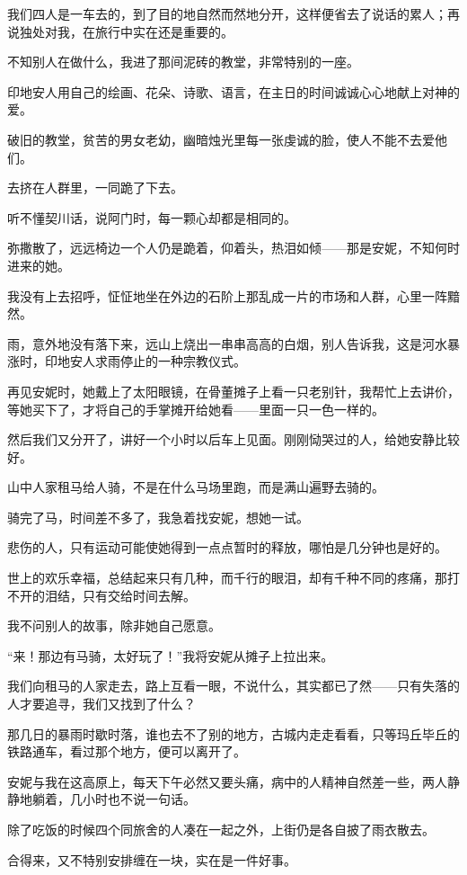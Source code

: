 \par 我们四人是一车去的，到了目的地自然而然地分开，这样便省去了说话的累人；再说独处对我，在旅行中实在还是重要的。
\par 不知别人在做什么，我进了那间泥砖的教堂，非常特别的一座。
\par 印地安人用自己的绘画、花朵、诗歌、语言，在主日的时间诚诚心心地献上对神的爱。
\par 破旧的教堂，贫苦的男女老幼，幽暗烛光里每一张虔诚的脸，使人不能不去爱他们。
\par 去挤在人群里，一同跪了下去。
\par 听不懂契川话，说阿门时，每一颗心却都是相同的。
\par 弥撒散了，远远椅边一个人仍是跪着，仰着头，热泪如倾——那是安妮，不知何时进来的她。
\par 我没有上去招呼，怔怔地坐在外边的石阶上那乱成一片的市场和人群，心里一阵黯然。
\par 雨，意外地没有落下来，远山上烧出一串串高高的白烟，别人告诉我，这是河水暴涨时，印地安人求雨停止的一种宗教仪式。
\par 再见安妮时，她戴上了太阳眼镜，在骨董摊子上看一只老别针，我帮忙上去讲价，等她买下了，才将自己的手掌摊开给她看——里面一只一色一样的。
\par 然后我们又分开了，讲好一个小时以后车上见面。刚刚恸哭过的人，给她安静比较好。
\par 山中人家租马给人骑，不是在什么马场里跑，而是满山遍野去骑的。
\par 骑完了马，时间差不多了，我急着找安妮，想她一试。
\par 悲伤的人，只有运动可能使她得到一点点暂时的释放，哪怕是几分钟也是好的。
\par 世上的欢乐幸福，总结起来只有几种，而千行的眼泪，却有千种不同的疼痛，那打不开的泪结，只有交给时间去解。
\par 我不问别人的故事，除非她自己愿意。
\par “来！那边有马骑，太好玩了！”我将安妮从摊子上拉出来。
\par 我们向租马的人家走去，路上互看一眼，不说什么，其实都已了然——只有失落的人才要追寻，我们又找到了什么？
\par 那几日的暴雨时歇时落，谁也去不了别的地方，古城内走走看看，只等玛丘毕丘的铁路通车，看过那个地方，便可以离开了。
\par 安妮与我在这高原上，每天下午必然又要头痛，病中的人精神自然差一些，两人静静地躺着，几小时也不说一句话。
\par 除了吃饭的时候四个同旅舍的人凑在一起之外，上街仍是各自披了雨衣散去。
\par 合得来，又不特别安排缠在一块，实在是一件好事。
